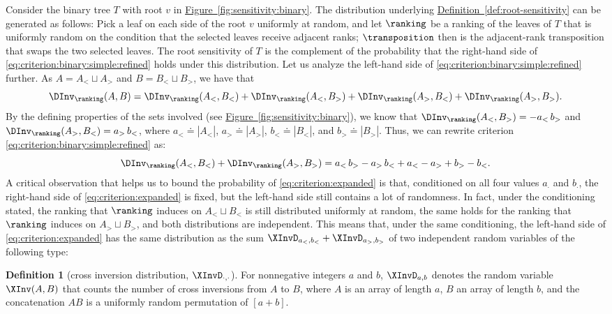 \documentclass[11pt]{article}
\numberwithin{equation}{section}
\theoremstyle{definition}
\newtheorem{definition}[theorem]{Definition}
\theoremstyle{plain}
\newcommand{\expref}[2]{\hyperref[#2]{#1~\ref{#2}}}
\begin{document}
Consider the binary tree $T$ with root $v$ in \expref{Figure}{fig:sensitivity:binary}. The distribution underlying \expref{Definition}{def:root-sensitivity} can be generated as follows: Pick a leaf on each side of the root $v$ uniformly at random, and let $\ranking$ be a ranking of the leaves of $T$ that is uniformly random on the condition that the selected leaves receive adjacent ranks; $\transposition$ then is the adjacent-rank transposition that swaps the two selected leaves. The root sensitivity of $T$ is the complement of the probability that the right-hand side of \eqref{eq:criterion:binary:simple:refined} holds under this distribution. Let us analyze the left-hand side of \eqref{eq:criterion:binary:simple:refined} further. As $A = A_< \sqcup A_>$ and $B = B_< \sqcup B_>$, we have that
\[ \DInv_\ranking(A,B) = \DInv_\ranking(A_<,B_<) + \DInv_\ranking(A_<,B_>) + \DInv_\ranking(A_>,B_<) + \DInv_\ranking(A_>,B_>). \]
By the defining properties of the sets involved (see \expref{Figure}{fig:sensitivity:binary}), we know that $\DInv_\ranking(A_<,B_>) = - a_< \, b_>$ and $\DInv_\ranking(A_>,B_<) = a_> \, b_<$, where $a_< \doteq |A_<|$, $a_> \doteq |A_>|$, $b_< \doteq |B_<|$, and $b_> \doteq |B_>|$. Thus, we can rewrite criterion \eqref{eq:criterion:binary:simple:refined} as:
\begin{equation}\label{eq:criterion:expanded}
\DInv_\ranking(A_<,B_<) + \DInv_\ranking(A_>,B_>) = a_< \, b_> - a_> \, b_< + a_< - a_> + b_> - b_<.
\end{equation}
A critical observation that helps us to bound the probability of \eqref{eq:criterion:expanded} is that, conditioned on all four values $a_{\cdot}$ and $b_{\cdot}$, the right-hand side of \eqref{eq:criterion:expanded} is fixed, but the left-hand side still contains a lot of randomness. In fact, under the conditioning stated, the ranking that $\ranking$ induces on $A_< \sqcup B_<$ is still distributed uniformly at random, the same holds for the ranking that $\ranking$ induces on $A_> \sqcup B_>$, and both distributions are independent. This means that, under the same conditioning, the left-hand side of \eqref{eq:criterion:expanded} has the same distribution as the sum $\XInvD_{a_<,b_<} + \XInvD_{a_>,b_>}$ of two independent random variables of the following type:
\begin{definition}[cross inversion distribution, $\XInvD_{\cdot,\cdot}$]
For nonnegative integers $a$ and $b$, $\XInvD_{a,b}$ denotes the random variable $\XInv(A,B)$ that counts the number of cross inversions from $A$ to $B$, where $A$ is an array of length $a$, $B$ an array of length $b$, and the concatenation $AB$ is a uniformly random permutation of $[a+b]$.
\end{definition}
\end{document}
